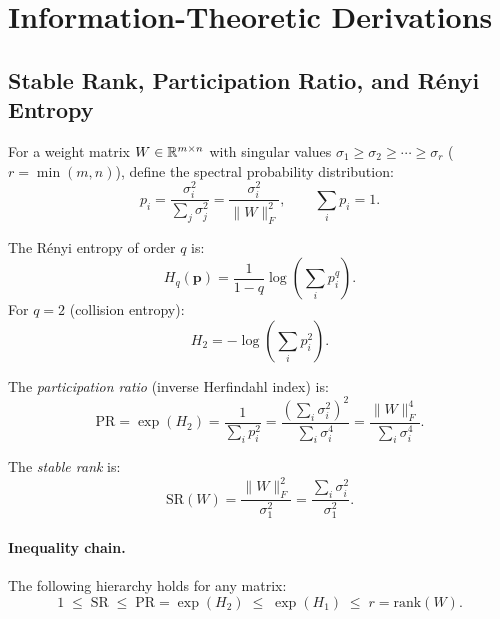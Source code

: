 \section{Information-Theoretic Derivations}
\label{app:info_theory}

\subsection{Stable Rank, Participation Ratio, and R\'{e}nyi Entropy}

For a weight matrix $W \in \mathbb{R}^{m \times n}$ with singular values $\sigma_1 \geq \sigma_2 \geq \cdots \geq \sigma_r$ ($r = \min(m,n)$), define the spectral probability distribution:
\begin{equation}
    p_i = \frac{\sigma_i^2}{\sum_j \sigma_j^2} = \frac{\sigma_i^2}{\|W\|_F^2}, \qquad \sum_i p_i = 1.
\end{equation}

The R\'{e}nyi entropy of order $q$ is:
\begin{equation}
    H_q(\mathbf{p}) = \frac{1}{1-q} \log\!\left(\sum_i p_i^q\right).
\end{equation}
For $q = 2$ (collision entropy):
\begin{equation}
    H_2 = -\log\!\left(\sum_i p_i^2\right).
\end{equation}

The \emph{participation ratio} (inverse Herfindahl index) is:
\begin{equation}
    \mathrm{PR} = \exp(H_2) = \frac{1}{\sum_i p_i^2} = \frac{\left(\sum_i \sigma_i^2\right)^2}{\sum_i \sigma_i^4} = \frac{\|W\|_F^4}{\sum_i \sigma_i^4}.
\end{equation}

The \emph{stable rank} is:
\begin{equation}
    \mathrm{SR}(W) = \frac{\|W\|_F^2}{\sigma_1^2} = \frac{\sum_i \sigma_i^2}{\sigma_1^2}.
\end{equation}

\paragraph{Inequality chain.} The following hierarchy holds for any matrix:
\begin{equation}
    1 \;\leq\; \mathrm{SR} \;\leq\; \mathrm{PR} = \exp(H_2) \;\leq\; \exp(H_1) \;\leq\; r = \mathrm{rank}(W).
\end{equation}

